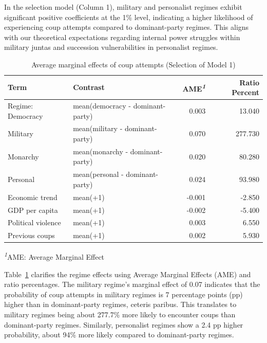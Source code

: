 \documentclass[
  12pt,
]{report}
\begin{document}
In the selection model (Column 1), military and personalist regimes
exhibit significant positive coefficients at the 1\% level, indicating a
higher likelihood of experiencing coup attempts compared to
dominant-party regimes. This aligns with our theoretical expectations
regarding internal power struggles within military juntas and succession
vulnerabilities in personalist regimes.

\begingroup
\setlength{}
\setlength{}\fontsize{12.0pt}{14.4pt}\selectfont
\setlength{\LTpost}{0mm}

\begin{longtable}{@{\extracolsep{\fill}}llrr}

\caption{\label{tbl-mfx1}Average marginal effects of coup attempts
(Selection of Model 1)}

\tabularnewline

\toprule
Term & Contrast & AME\textsuperscript{\textit{1}} & Ratio Percent \\ 
\midrule\addlinespace[2.5pt]
Regime: Democracy & mean(democracy - dominant-party) & 0.003 & 13.040 \\ 
{\hspace{47.25pt}Military} & mean(military - dominant-party) & 0.070 & 277.730 \\ 
{\hspace{47.25pt}Monarchy} & mean(monarchy - dominant-party) & 0.020 & 80.280 \\ 
{\hspace{47.25pt}Personal} & mean(personal - dominant-party) & 0.024 & 93.980 \\ 
Economic trend & mean(+1) & -0.001 & -2.850 \\ 
GDP per capita & mean(+1) & -0.002 & -5.400 \\ 
Political violence & mean(+1) & 0.003 & 6.550 \\ 
Previous coups & mean(+1) & 0.002 & 5.930 \\ 
\bottomrule

\end{longtable}

\begin{minipage}{\linewidth}
\textsuperscript{\textit{1}}AME: Average Marginal Effect\\
\end{minipage}
\endgroup

Table~\ref{tbl-mfx1} clarifies the regime effects using Average Marginal
Effects (AME) and ratio percentages. The military regime's marginal
effect of 0.07 indicates that the probability of coup attempts in
military regimes is 7 percentage points (pp) higher than in
dominant-party regimes, ceteris paribus. This translates to military
regimes being about 277.7\% more likely to encounter coups than
dominant-party regimes. Similarly, personalist regimes show a 2.4 pp
higher probability, about 94\% more likely compared to dominant-party
regimes.
\end{document}
